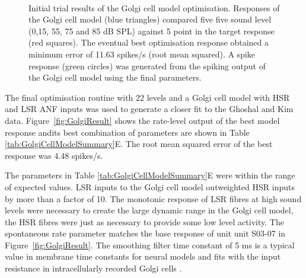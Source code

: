 \begin{figure}[htb]
  \centering
  \\
  \caption{Initial trial results of the Golgi cell model optimisation.
    Responses of the Golgi cell model (blue triangles) compared five five sound
    level (0,15, 55, 75 and 85 dB SPL) against 5 point in the target response
    (red squares). The eventual best optimisation response obtained a minimum
    error of 11.63 spikes/s (root mean squared). A spike response (green
    circles) was generated from the spiking output of the Golgi cell model using
    the final parameters.  }\label{fig:GolgiTestResult}
\end{figure}

The final optimisation routine with 22 levels and a Golgi cell model with HSR
and LSR ANF inputs was used to generate a closer fit to the Ghoshal and Kim
data. Figure~\ref{fig:GolgiResult} shows the rate-level output of the best model
response andits best combination of parameters are shown in Table
\ref{tab:GolgiCellModelSummary}E. The root mean squared error of the best
response was 4.48 spikes/s.

The parameters in Table \ref{tab:GolgiCellModelSummary}E were within the range
of expected values. LSR inputs to the Golgi cell model outweighted HSR inputs by
more than a factor of 10. The monotonic response of LSR fibres at high sound
levels were necessary to create the large dynamic range in the Golgi cell model,
the HSR fibres were just as necessary to provide some low level activity. The
spontaneous rate parameter matches the base response of unit unit S03-07 in
Figure~\ref{fig:GolgiResult}. The smoothing filter time constant of 5 ms is a
typical value in membrane time constants for neural models and fits with the
input resistance in intracellularly recorded Golgi cells
\citep{FerragamoGoldingEtAl:1998}.
  


